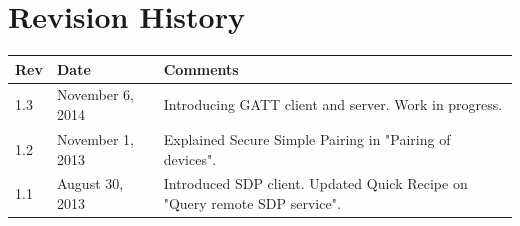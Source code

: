 \documentclass[a4paper,titlepage,oneside,12pt]{amsart} %
\begin{document}
\pagebreak

\section{Revision History}
\label{appendix:revision_history}

\begin{table}[!htbp]
\begin{tabular*}{\textwidth}{lp{3.5cm}p{8.5cm}}\toprule
Rev & Date & Comments\\ 
\midrule
1.3 & November 6, 2014 & Introducing GATT client and server. Work in progress.\\
1.2 & November 1, 2013 & Explained Secure Simple Pairing in "Pairing of devices".\\
1.1 & August 30, 2013 & Introduced SDP client. Updated Quick Recipe on "Query remote SDP service".\\
\bottomrule
\end{tabular*}
\end{table}

%
%


% 
% 


\end{document}
